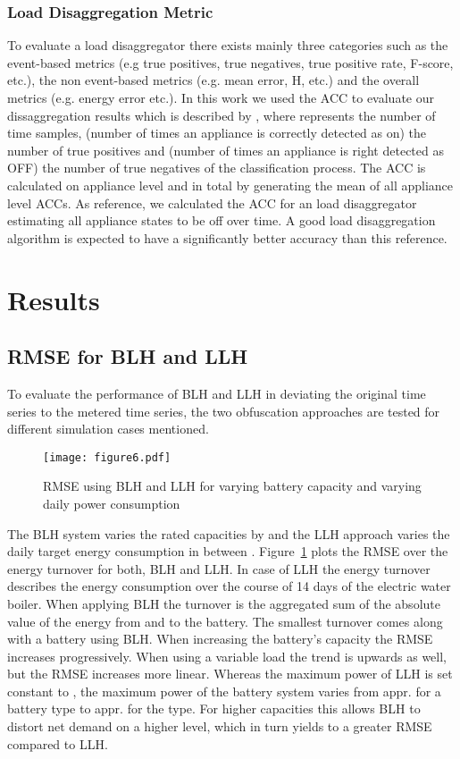 \documentclass{article}
\begin{document}
\subsubsection{Load Disaggregation Metric}
To evaluate a load disaggregator there exists mainly three categories such as the event-based metrics (e.g true positives, true negatives, true positive rate, F-score, etc.), the non event-based metrics (e.g. mean error, \ac{H}, etc.) and the overall metrics (e.g. energy error etc.).
In this work we used the \ac{ACC} to evaluate our dissaggregation results which is described by
, where  represents the number of time samples,  (number of times an appliance is correctly detected as on) the number of true positives and  (number of times an appliance is right detected as OFF) the number of true negatives of the classification process.
The \ac{ACC} is calculated on appliance level and in total by generating the mean of all appliance level \acp{ACC}.
As reference, we calculated the \ac{ACC} for an load disaggregator estimating all appliance states to be off over time. 
A good load disaggregation algorithm is expected to have a significantly better accuracy than this reference.




\section{Results}\label{sec:results}
\subsection{RMSE for \ac{BLH} and \ac{LLH}}

To evaluate the performance of \ac{BLH} and \ac{LLH} in deviating the original time series to the metered time series, the two obfuscation approaches are tested for different simulation cases mentioned.
\begin{figure}[h!]
	\centering
	\texttt{[image: figure6.pdf]}
	\caption{\ac{RMSE} using \ac{BLH} and \ac{LLH} for varying battery capacity and varying daily power consumption}  
	\label{rmse}
\end{figure}
The BLH system varies the rated capacities by  and the LLH approach varies the daily target energy consumption in between .
Figure~\ref{rmse} plots the \ac{RMSE} over the energy turnover for both, \ac{BLH} and \ac{LLH}. In case of \ac{LLH} the energy turnover describes the energy consumption over the course of 14 days of the electric water boiler. When applying \ac{BLH} the turnover is the aggregated sum of the absolute value of the energy from and to the battery. The smallest turnover comes along with a  battery using \ac{BLH}. When increasing the battery's capacity the \ac{RMSE} increases progressively. When using a variable load the trend is upwards as well, but the \ac{RMSE} increases more linear. Whereas the maximum power of \ac{LLH} is set constant to , the maximum power of the battery system varies from appr.  for a  battery type to appr.  for the  type. For higher capacities this allows \ac{BLH} to distort net demand on a higher level, which in turn yields to a greater \ac{RMSE} compared to \ac{LLH}.
\end{document}
